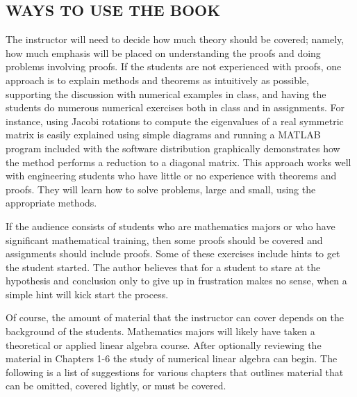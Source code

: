 \documentclass[../main.tex]{subfiles}
\begin{document}
\subsection*{WAYS TO USE THE BOOK}
The instructor will need to decide how much theory should be covered; namely, how much emphasis will be placed on understanding the proofs and doing problems involving proofs. If the students are not experienced with proofs, one approach is to explain methods and theorems as intuitively as possible, supporting the discussion with numerical examples in class, and having the students do numerous numerical exercises both in class and in assignments. For instance, using Jacobi rotations to compute the eigenvalues of a real symmetric matrix is easily explained using simple diagrams and running a MATLAB program included with the software distribution graphically demonstrates how the method performs a reduction to a diagonal matrix. This approach works well with engineering students who have little or no experience with theorems and proofs. They will learn how to solve problems, large and small, using the appropriate methods.

If the audience consists of students who are mathematics majors or who have significant mathematical training, then some proofs should be covered and assignments should include proofs. Some of these exercises include hints to get the student started. The author believes that for a student to stare at the hypothesis and conclusion only to give up in frustration makes no sense, when a simple hint will kick start the process.

Of course, the amount of material that the instructor can cover depends on the background of the students. Mathematics majors will likely have taken a theoretical or applied linear algebra course. After optionally reviewing the material in Chapters 1-6 the study of numerical linear algebra can begin. The following is a list of suggestions for various chapters that outlines material that can be omitted, covered lightly, or must be covered.
\end{document}
